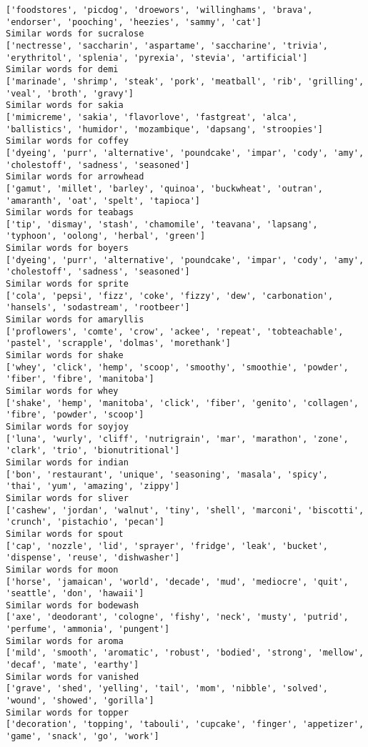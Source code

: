 \documentclass[11pt]{article}
\begin{document}
\begin{Verbatim}[commandchars=\\\{\}]
['foodstores', 'picdog', 'droewors', 'willinghams', 'brava', 'endorser', 'pooching', 'heezies', 'sammy', 'cat']
Similar words for sucralose
['nectresse', 'saccharin', 'aspartame', 'saccharine', 'trivia', 'erythritol', 'splenia', 'pyrexia', 'stevia', 'artificial']
Similar words for demi
['marinade', 'shrimp', 'steak', 'pork', 'meatball', 'rib', 'grilling', 'veal', 'broth', 'gravy']
Similar words for sakia
['mimicreme', 'sakia', 'flavorlove', 'fastgreat', 'alca', 'ballistics', 'humidor', 'mozambique', 'dapsang', 'stroopies']
Similar words for coffey
['dyeing', 'purr', 'alternative', 'poundcake', 'impar', 'cody', 'amy', 'cholestoff', 'sadness', 'seasoned']
Similar words for arrowhead
['gamut', 'millet', 'barley', 'quinoa', 'buckwheat', 'outran', 'amaranth', 'oat', 'spelt', 'tapioca']
Similar words for teabags
['tip', 'dismay', 'stash', 'chamomile', 'teavana', 'lapsang', 'typhoon', 'oolong', 'herbal', 'green']
Similar words for boyers
['dyeing', 'purr', 'alternative', 'poundcake', 'impar', 'cody', 'amy', 'cholestoff', 'sadness', 'seasoned']
Similar words for sprite
['cola', 'pepsi', 'fizz', 'coke', 'fizzy', 'dew', 'carbonation', 'hansels', 'sodastream', 'rootbeer']
Similar words for amaryllis
['proflowers', 'comte', 'crow', 'ackee', 'repeat', 'tobteachable', 'pastel', 'scrapple', 'dolmas', 'morethank']
Similar words for shake
['whey', 'click', 'hemp', 'scoop', 'smoothy', 'smoothie', 'powder', 'fiber', 'fibre', 'manitoba']
Similar words for whey
['shake', 'hemp', 'manitoba', 'click', 'fiber', 'genito', 'collagen', 'fibre', 'powder', 'scoop']
Similar words for soyjoy
['luna', 'wurly', 'cliff', 'nutrigrain', 'mar', 'marathon', 'zone', 'clark', 'trio', 'bionutritional']
Similar words for indian
['bon', 'restaurant', 'unique', 'seasoning', 'masala', 'spicy', 'thai', 'yum', 'amazing', 'zippy']
Similar words for sliver
['cashew', 'jordan', 'walnut', 'tiny', 'shell', 'marconi', 'biscotti', 'crunch', 'pistachio', 'pecan']
Similar words for spout
['cap', 'nozzle', 'lid', 'sprayer', 'fridge', 'leak', 'bucket', 'dispense', 'reuse', 'dishwasher']
Similar words for moon
['horse', 'jamaican', 'world', 'decade', 'mud', 'mediocre', 'quit', 'seattle', 'don', 'hawaii']
Similar words for bodewash
['axe', 'deodorant', 'cologne', 'fishy', 'neck', 'musty', 'putrid', 'perfume', 'ammonia', 'pungent']
Similar words for aroma
['mild', 'smooth', 'aromatic', 'robust', 'bodied', 'strong', 'mellow', 'decaf', 'mate', 'earthy']
Similar words for vanished
['grave', 'shed', 'yelling', 'tail', 'mom', 'nibble', 'solved', 'wound', 'showed', 'gorilla']
Similar words for topper
['decoration', 'topping', 'tabouli', 'cupcake', 'finger', 'appetizer', 'game', 'snack', 'go', 'work']

\end{Verbatim}
\end{document}
